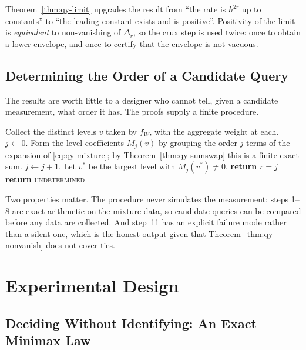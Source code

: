 Theorem~\ref{thm:qy-limit} upgrades the result from ``the rate is $h^{2r}$ up to constants'' to
``the leading constant exists and is positive''. Positivity of the limit is \emph{equivalent}
to non-vanishing of $\Delta_{r}$, so the crux step is used twice: once to obtain a lower
envelope, and once to certify that the envelope is not vacuous.

\subsection{Determining the Order of a Candidate Query}
\label{sec:qy-procedure}

The results are worth little to a designer who cannot tell, given a candidate measurement,
what order it has. The proofs supply a finite procedure.

\begin{algorithm}[htbp]
\caption{Leakage order of a candidate measurement}
\label{alg:qy-order}
\begin{algorithmic}[1]
\STATE Collect the distinct levels $v$ taken by $f_{W}$, with the aggregate weight at each.
\STATE $j\leftarrow0$.
\REPEAT
  \STATE Form the level coefficients $M_{j}(v)$ by grouping the order-$j$ terms of the
         expansion of \eqref{eq:qy-mixture}; by Theorem~\ref{thm:qy-sumswap} this is a finite
         exact sum.
    \STATE $j\leftarrow j+1$.
  \ENDIF
{}
\STATE Let $v^{*}$ be the largest level with $M_{j}(v^{*})\neq0$.
  \STATE \textbf{return} $r=j$ 
\ELSE
  \STATE \textbf{return} \textsc{undetermined} 
\ENDIF
\end{algorithmic}
\end{algorithm}

Two properties matter. The procedure never simulates the measurement: steps 1--8 are exact
arithmetic on the mixture data, so candidate queries can be compared before any data are
collected. And step~11 has an explicit failure mode rather than a silent one, which is the
honest output given that Theorem~\ref{thm:qy-nonvanish} does not cover ties.


\section{Experimental Design}

\subsection{Deciding Without Identifying: An Exact Minimax Law}
\label{sec:sp-expdesign}


